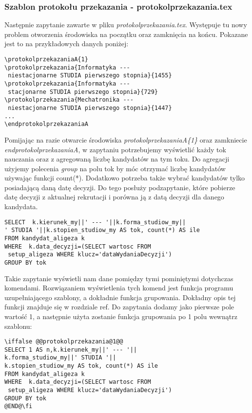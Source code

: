 \subsubsection*{Szablon protokołu przekazania -  protokolprzekazania.tex}
Następnie zapytanie zawarte w pliku \emph{protokolprzekazania.tex}. Występuje tu nowy problem otworzenia środowiska na początku oraz zamknięcia na końcu. Pokazane jest to na przykładowych danych poniżej:
 \begin{lstlisting}
\protokolprzekazaniaA{1}
\protokolprzekazania{Informatyka ---
 niestacjonarne STUDIA pierwszego stopnia}{1455}
\protokolprzekazania{Informatyka ---
 stacjonarne STUDIA pierwszego stopnia}{729}
\protokolprzekazania{Mechatronika ---
 niestacjonarne STUDIA pierwszego stopnia}{1447}
...
\endprotokolprzekazaniaA        
\end{lstlisting}
Pomijając na razie otwarcie środowiska \emph{protokolprzekazaniaA\{1\} }oraz zamkniecie \emph{endprotokolprzekazaniaA}, w zapytaniu potrzebujemy wyświetlić każdy tok nauczania oraz z agregowaną liczbę kandydatów na tym toku. Do agregacji użyjemy polecenia \emph{group}  na polu tok by móc otrzymać liczbę kandydatów używając funkcji count(*). Dodatkowo potrzeba także wybrać kandydatów tylko posiadającą daną datę decyzji. Do tego posłuży podzapytanie, które pobierze datę decyzji z aktualnej rekrutacji i porówna ją z datą decyzji dla danego kandydata. 
 \begin{lstlisting}
SELECT  k.kierunek_my||' --- '||k.forma_studiow_my||
' STUDIA '||k.stopien_studiow_my AS tok, count(*) AS ile
FROM kandydat_aligeza k
WHERE  k.data_decyzji=(SELECT wartosc FROM
 setup_aligeza WHERE klucz='dataWydaniaDecyzji') 
GROUP BY tok
\end{lstlisting}
Takie zapytanie wyświetli nam dane pomiędzy tymi pominiętymi dotychczas komendami. 
Rozwiązaniem wyświetlenia tych komend jest funkcja programu uzupełniającego szablony, a dokładnie funkcja grupowania. Dokładny opis tej funkcji znajduje się w rozdziale ref. Do zapytania dodamy jako pierwsze pole wartość 1, a następnie użyta zostanie funkcja grupowania po 1 polu wewnątrz szablonu:
 \begin{lstlisting}
\iffalse @@protokolprzekazania@1@@
SELECT 1 AS n,k.kierunek_my||' --- '||
k.forma_studiow_my||' STUDIA '||
k.stopien_studiow_my AS tok, count(*) AS ile
FROM kandydat_aligeza k
WHERE  k.data_decyzji=(SELECT wartosc FROM
 setup_aligeza WHERE klucz='dataWydaniaDecyzji') 
GROUP BY tok
@END@\fi
\end{lstlisting}

